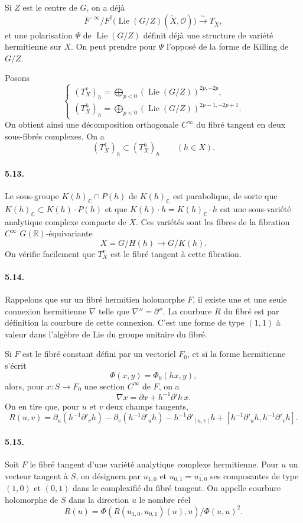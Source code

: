 \documentclass[10pt]{article}
\newcommand{\C}{\mathbb C}
\newcommand{\R}{\mathbb R}
\newcommand{\cO}{\mathcal O}
\theoremstyle{deligne}
\newcommand{\Lie}{\operatorname{Lie}}
\begin{document}
Si $Z$ est le centre de $G$, on a déjà
\[
\tag{5.12.2}
  F^{-\infty}/F^0\bigl(\Lie(G/Z)(\check X,\cO)\bigr)
  \xrightarrow{\sim} T_{\check X},
\]
et une polarisation $\Psi$ de $\Lie(G/Z)$ définit déjà une structure de variété hermitienne sur $X$. On peut prendre pour $\Psi$ l'opposé de la forme de Killing de $G/Z$.

Posons
\[
\tag{5.12.3}
\begin{cases}
 (T_X^v)_h=\displaystyle\bigoplus_{p<0}(\Lie(G/Z))^{2p,-2p},\\[0.4em]
 (T_X^h)_h=\displaystyle\bigoplus_{p<0}(\Lie(G/Z))^{2p-1,-2p+1}.
\end{cases}
\]
On obtient ainsi une décomposition orthogonale $C^\infty$ du fibré tangent en deux sous-fibrés complexes. On a
\[
\tag{5.12.4}
  (T_X^1)_h\subset (T_X^h)_h \qquad (h\in X).
\]

\paragraph{5.13.}
Le sous-groupe $K(h)_\C\cap P(h)$ de $K(h)_\C$ est parabolique, de sorte que $K(h)_\C\subset K(h)\cdot P(h)$ et que $K(h)\cdot h=K(h)_\C\cdot h$ est une sous-variété analytique complexe compacte de $X$. Ces variétés sont les fibres de la fibration $C^\infty$ $G(\R)$-équivariante
\[
  X=G/H(h)\longrightarrow G/K(h).
\]
On vérifie facilement que $T_X^v$ est le fibré tangent à cette fibration.

\paragraph{5.14.}
Rappelons que sur un fibré hermitien holomorphe $F$, il existe une et une seule connexion hermitienne $\nabla$ telle que $\nabla''=\partial''$. La courbure $R$ du fibré est par définition la courbure de cette connexion. C'est une forme de type $(1,1)$ à valeur dans l'algèbre de Lie du groupe unitaire du fibré.

Si $F$ est le fibré constant défini par un vectoriel $F_0$, et si la forme hermitienne s'écrit
\[
\tag{5.14.1}
  \Phi(x,y)=\Phi_0(hx,y),
\]
alors, pour $x:S\to F_0$ une section $C^\infty$ de $F$, on a
\[
\tag{5.14.2}
  \nabla x=\partial x+h^{-1}\partial' h\,x.
\]
On en tire que, pour $u$ et $v$ deux champs tangents,
\[
\tag{5.14.3}
  R(u,v)=
  \partial_u(h^{-1}\partial'_v h)
  -\partial_v(h^{-1}\partial'_u h)
  -h^{-1}\partial'_{[u,v]}h
  +[h^{-1}\partial'_u h,h^{-1}\partial'_v h].
\]

\paragraph{5.15.}
Soit $F$ le fibré tangent d'une variété analytique complexe hermitienne. Pour $u$ un vecteur tangent à $S$, on désignera par $u_{1,0}$ et $u_{0,1}=\overline{u_{1,0}}$ ses composantes de type $(1,0)$ et $(0,1)$ dans le complexifié du fibré tangent. On appelle courbure holomorphe de $S$ dans la direction $u$ le nombre réel
\[
\tag{5.15.1}
  R(u)=
  \Phi(R(u_{1,0},u_{0,1})(u),u)/\Phi(u,u)^2.
\]
\end{document}

